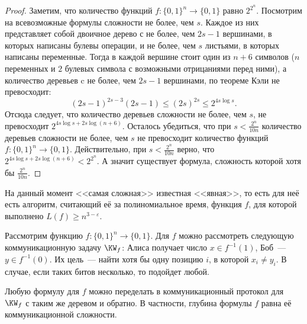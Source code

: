 \begin{proof}
    Заметим, что количество функций $f\colon \{0, 1\}^n \to \{0, 1\}$ равно $2^{2^n}$. Посмотрим на
    всевозможные формулы сложности не более, чем $s$. Каждое из них представляет собой двоичное дерево
    с не более, чем $2s - 1$ вершинами, в которых написаны булевы операции, и не более, чем $s$ листьями,
    в которых написаны переменные. Тогда в каждой вершине стоит один из $n + 6$ символов ($n$ переменных и
    $2$ булевых символа с возможными отрицаниями перед ними), а количество деревьев c не более, чем
    $2s - 1$ вершинами, по теореме Кэли не превосходит:
    $$
        (2s - 1)^{2s - 3}(2s - 1) \le (2s)^{2s} \le 2^{4s \log s}.
    $$ 
    Отсюда следует, что количество деревьев сложности не более, чем $s$, не превосходит
    $2^{4s \log s + 2s \log(n + 6)}$. Осталось убедиться, что при $s < \frac{2^n}{10n}$ количество
    деревьев сложности не более, чем $s$ не превосходит количество функций
    $f\colon \{0, 1\}^n \to \{0, 1\}$. Действительно, при $s < \frac{2^n}{10n}$ верно, что
    $2^{4s\log s + 2s \log(n + 6)} < 2^{2^n}$. А значит существует формула, сложность которой хотя бы
    $\frac{2^n}{10n}$.
\end{proof}
    
На данный момент <<самая сложная>> известная <<явная>>, то есть для неё есть алгоритм, считающий её за
полиномиальное время, функция $f$, для которой выполнено $L(f) \geq n^{3 - \varepsilon}$.

Рассмотрим функцию $f\colon \{0, 1\}^n \to \{0, 1\}$. Для $f$ можно рассмотреть следующую
коммуникационную задачу $\KW_f$: Алиса получает число $x \in f^{-1}(1)$, Боб~--- $y \in f^{-1}(0)$. Их
цель~--- найти хотя бы одну позицию $i$, в которой $x_i \ne y_i$. В случае, если таких битов несколько,
то подойдет любой.

\begin{theorem}
    \label{th:KW-theorem}
    Любую формулу для $f$ можно переделать в коммуникационный протокол для $\KW_f$ с таким же деревом и
    обратно. В частности, глубина формулы $f$ равна её коммуникационной сложности.
\end{theorem}

